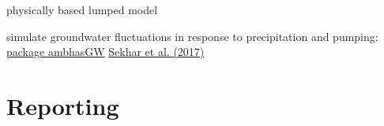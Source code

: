 \documentclass[8pt,ignorenonframetext,]{beamer}
\newcommand{\columnsend}{\end{columns}}
\begin{document}

\begin{frame}{physically based lumped model}

simulate groundwater fluctuations in response to precipitation and
pumping: \href{https://cran.r-project.org/package=ambhasGW}{package
ambhasGW} \href{www.mdpi.com/2071-1050/10/1/26/pdf}{Sekhar et al.
(2017)}

\end{frame}

\section{Reporting}\label{reporting}
\end{document}
